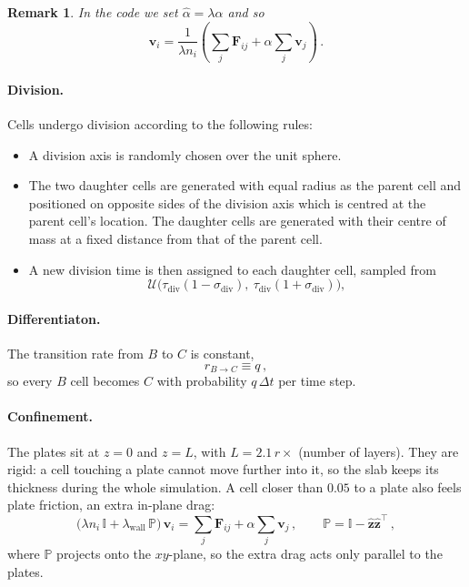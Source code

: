 \documentclass{article}
\newtheorem{remark}{Remark}
\begin{document}
    \begin{remark}
        In the code we set $\hat\alpha=\lambda\alpha$ and so
        \begin{equation*}
            {\mathbf{v}}_i = \frac{1}{{\lambda} n_i}\left( \sum_j {\mathbf{F}}_{ij} + \alpha \sum_j {\mathbf{v}}_j \right) \,.
        \end{equation*}
    \end{remark}

\paragraph{Division.}

    Cells undergo division according to the following rules:
    \begin{itemize}
        \item A division axis is randomly chosen over the unit sphere.
        \item The two daughter cells are generated with equal radius as the parent cell and positioned on opposite sides of the division axis which is centred at the parent cell's location. The daughter cells are generated with their centre of mass at a fixed distance from that of the parent cell.
        \item A new division time is then assigned to each daughter cell, sampled from
        \begin{equation*}
            \mathcal{U}\big(\tau_{\text{div}}(1 - \sigma_{\text{div}}),\ \tau_{\text{div}}(1 + \sigma_{\text{div}})\big),
        \end{equation*}
    \end{itemize}

\paragraph{Differentiaton.}

    The {transition rate} from $B$ to $C$ is constant,
    \begin{equation*}
        r_{B\rightarrow C} \equiv q \,,
    \end{equation*}
    so every $B$ cell becomes $C$ with probability $q\,\Delta t$ per time step.

\paragraph{Confinement.}
    The {plates} sit at $z=0$ and $z=L$, with $L = 2.1\,r \times$ (number of layers). They are rigid: a cell touching a plate cannot move further into it, so the slab keeps its thickness during the whole simulation. A cell closer than $0.05$ to a plate also feels {plate friction}, an extra in-plane drag:
    \begin{equation*}
        \big(\lambda n_i\, \mathbb{I} + \lambda_\text{wall}\, \mathbb{P}\big)\, \mathbf{v}_i = \sum_j \mathbf{F}_{ij} + \alpha \sum_j \mathbf{v}_j \,, \qquad \mathbb{P} = \mathbb{I} - \hat{\mathbf{z}}\hat{\mathbf{z}}^\top \,,
    \end{equation*}
    where $\mathbb{P}$ projects onto the $xy$-plane, so the extra drag acts only parallel to the plates.
\end{document}
